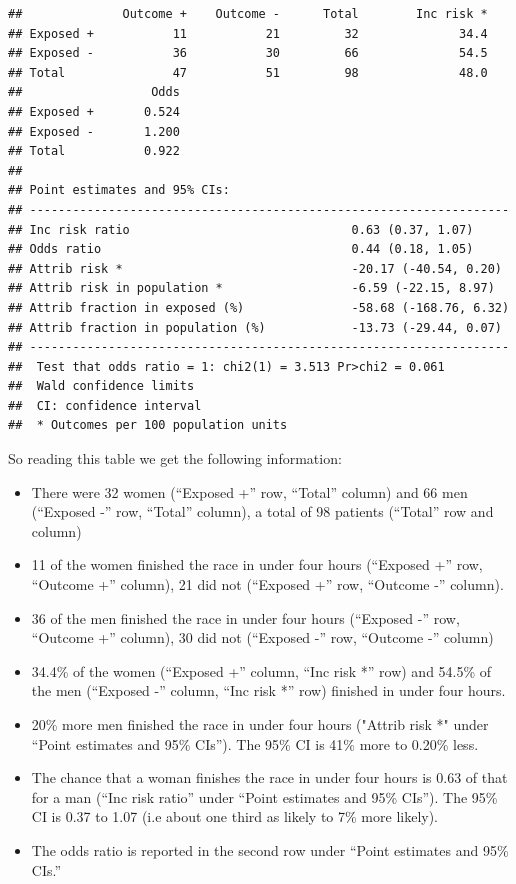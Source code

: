 \documentclass[]{book}
\providecommand{\tightlist}{%
  \setlength{\itemsep}{0pt}\setlength{\parskip}{0pt}}
\begin{document}
\begin{verbatim}
##              Outcome +    Outcome -      Total        Inc risk *
## Exposed +           11           21         32              34.4
## Exposed -           36           30         66              54.5
## Total               47           51         98              48.0
##                  Odds
## Exposed +       0.524
## Exposed -       1.200
## Total           0.922
## 
## Point estimates and 95% CIs:
## -------------------------------------------------------------------
## Inc risk ratio                               0.63 (0.37, 1.07)
## Odds ratio                                   0.44 (0.18, 1.05)
## Attrib risk *                                -20.17 (-40.54, 0.20)
## Attrib risk in population *                  -6.59 (-22.15, 8.97)
## Attrib fraction in exposed (%)               -58.68 (-168.76, 6.32)
## Attrib fraction in population (%)            -13.73 (-29.44, 0.07)
## -------------------------------------------------------------------
##  Test that odds ratio = 1: chi2(1) = 3.513 Pr>chi2 = 0.061
##  Wald confidence limits
##  CI: confidence interval
##  * Outcomes per 100 population units
\end{verbatim}

So reading this table we get the following information:

\begin{itemize}
\tightlist
\item
  There were 32 women (``Exposed +'' row, ``Total'' column) and 66 men
  (``Exposed -'' row, ``Total'' column), a total of 98 patients
  (``Total'' row and column)
\item
  11 of the women finished the race in under four hours (``Exposed +''
  row, ``Outcome +'' column), 21 did not (``Exposed +'' row, ``Outcome
  -'' column).
\item
  36 of the men finished the race in under four hours (``Exposed -''
  row, ``Outcome +'' column), 30 did not (``Exposed -'' row, ``Outcome
  -'' column)
\item
  34.4\% of the women (``Exposed +'' column, ``Inc risk *'' row) and
  54.5\% of the men (``Exposed -'' column, ``Inc risk *'' row) finished
  in under four hours.
\item
  20\% more men finished the race in under four hours ("Attrib risk *"
  under ``Point estimates and 95\% CIs''). The 95\% CI is 41\% more to
  0.20\% less.
\item
  The chance that a woman finishes the race in under four hours is 0.63
  of that for a man (``Inc risk ratio'' under ``Point estimates and 95\%
  CIs''). The 95\% CI is 0.37 to 1.07 (i.e about one third as likely to
  7\% more likely).
\item
  The odds ratio is reported in the second row under ``Point estimates
  and 95\% CIs.''
\end{itemize}
\end{document}
